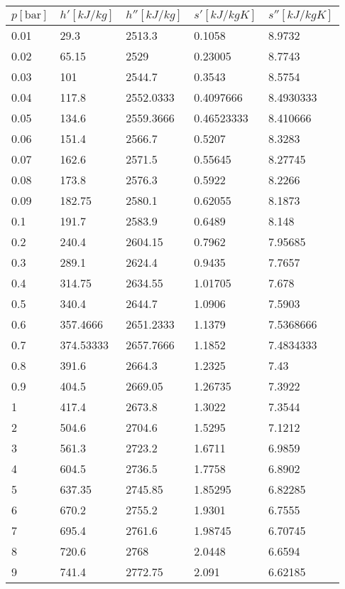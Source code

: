 \documentclass[twocolumn]{article}
\begin{document}
\begin{tabular}{l|l|l|l|l}
	$p [\text{bar}] $ & $h' [kJ/kg]$ & $h'' [kJ/kg]$ & $s' [kJ/kg K] $ & $s'' [kJ/kg K]$ \\ \hline
0.01	&	29.3	&	2513.3	&	0.1058	&	8.9732 \\ \hline
0.02	&	65.15	&	2529	&	0.23005	&	8.7743 \\ \hline
0.03	&	101	&	2544.7	&	0.3543	&	8.5754 \\ \hline
0.04	&	117.8	&	2552.0333	&	0.4097666	&	8.4930333 \\ \hline
0.05	&	134.6	&	2559.3666	&	0.46523333	&	8.410666 \\ \hline
0.06	&	151.4	&	2566.7	&	0.5207	&	8.3283 \\ \hline
0.07	&	162.6	&	2571.5	&	0.55645	&	8.27745 \\ \hline
0.08	&	173.8	&	2576.3	&	0.5922	&	8.2266 \\ \hline
0.09	&	182.75	&	2580.1	&	0.62055	&	8.1873 \\ \hline
0.1	&	191.7	&	2583.9	&	0.6489	&	8.148 \\ \hline
0.2	&	240.4	&	2604.15	&	0.7962	&	7.95685 \\ \hline
0.3	&	289.1	&	2624.4	&	0.9435	&	7.7657 \\ \hline
0.4	&	314.75	&	2634.55	&	1.01705	&	7.678 \\ \hline
0.5	&	340.4	&	2644.7	&	1.0906	&	7.5903 \\ \hline
0.6	&	357.4666	&	2651.2333	&	1.1379	&	7.5368666 \\ \hline
0.7	&	374.53333	&	2657.7666	&	1.1852	&	7.4834333 \\ \hline
0.8	&	391.6	&	2664.3	&	1.2325	&	7.43 \\ \hline
0.9	&	404.5	&	2669.05	&	1.26735	&	7.3922 \\ \hline
1	&	417.4	&	2673.8	&	1.3022	&	7.3544 \\ \hline
2	&	504.6	&	2704.6	&	1.5295	&	7.1212 \\ \hline
3	&	561.3	&	2723.2	&	1.6711	&	6.9859 \\ \hline
4	&	604.5	&	2736.5	&	1.7758	&	6.8902 \\ \hline
5	&	637.35	&	2745.85	&	1.85295	&	6.82285 \\ \hline
6	&	670.2	&	2755.2	&	1.9301	&	6.7555 \\ \hline
7	&	695.4	&	2761.6	&	1.98745	&	6.70745 \\ \hline
8	&	720.6	&	2768	&	2.0448	&	6.6594 \\ \hline
9	&	741.4	&	2772.75	&	2.091	&	6.62185 \\ \hline

\end{tabular}
\end{document}
